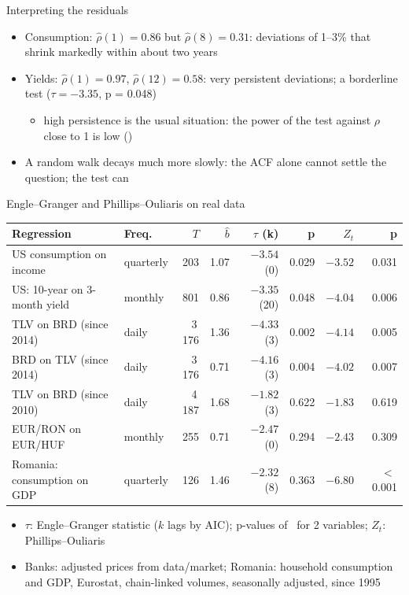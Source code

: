 \begin{frame}{Interpreting the residuals}
\itemsize{\small}
\begin{itemize}
    \item Consumption: $\hat\rho(1) = 0.86$ but $\hat\rho(8) = 0.31$: deviations of 1--3\% that shrink markedly within about two years
    \item Yields: $\hat\rho(1) = 0.97$, $\hat\rho(12) = 0.58$: very persistent deviations; a borderline test ($\tau = -3.35$, p = 0.048)
    \begin{itemize}
        \item high persistence is the usual situation: the power of the test against $\rho$ close to 1 is low ()
    \end{itemize}
    \item A random walk decays much more slowly: the ACF alone cannot settle the question; the test can
\end{itemize}
\end{frame}

\begin{frame}{Engle--Granger and Phillips--Ouliaris on real data}
\itemsize{\small}
\begin{center}
\scriptsize
\begin{tabular}{llrrrrrr}
\toprule
\textbf{Regression} & \textbf{Freq.} & $T$ & $\hat b$ & $\tau$ (k) & p & $Z_t$ & p \\
\midrule
US consumption on income & quarterly & 203 & 1.07 & $-3.54$ (0) & 0.029 & $-3.52$ & 0.031 \\
US: 10-year on 3-month yield & monthly & 801 & 0.86 & $-3.35$ (20) & 0.048 & $-4.04$ & 0.006 \\
TLV on BRD (since 2014) & daily & 3\,176 & 1.36 & $-4.33$ (3) & 0.002 & $-4.14$ & 0.005 \\
BRD on TLV (since 2014) & daily & 3\,176 & 0.71 & $-4.16$ (3) & 0.004 & $-4.02$ & 0.007 \\
TLV on BRD (since 2010) & daily & 4\,187 & 1.68 & $-1.82$ (3) & 0.622 & $-1.83$ & 0.619 \\
EUR/RON on EUR/HUF & monthly & 255 & 0.71 & $-2.47$ (0) & 0.294 & $-2.43$ & 0.309 \\
Romania: consumption on GDP & quarterly & 126 & 1.46 & $-2.32$ (8) & 0.363 & $-6.80$ & $<$\,0.001 \\
\bottomrule
\end{tabular}
\end{center}
\begin{itemize}
    \item $\tau$: Engle--Granger statistic ($k$ lags by AIC); p-values of \ for 2 variables; $Z_t$: Phillips--Ouliaris
    \item Banks: adjusted prices from data/market; Romania: household consumption and GDP, Eurostat, chain-linked volumes, seasonally adjusted, since 1995
\end{itemize}
\end{frame}

